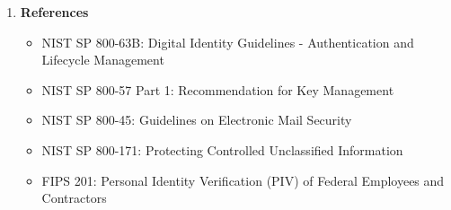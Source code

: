 \documentclass[11pt,letterpaper]{article}
\newcommand{\dmsection}[1]{\item \textbf{#1}\par}
\begin{document}
\begin{enumerate}
\begin{enumerate}
    \item \textbf{Certificate-based encryption} (S/MIME with PIV/CAC) is the preferred method when feasible
    \item When using password-based encryption, passwords \textbf{SHALL} be transmitted via out-of-band channel (phone, SMS, in-person)
    \item The password email feature is retained for operational flexibility but includes prominent warnings about NIST non-compliance
    \item Documentation clearly states these requirements
\end{enumerate}

\dmsection{References}

\begin{itemize}
    \item NIST SP 800-63B: Digital Identity Guidelines - Authentication and Lifecycle Management
    \item NIST SP 800-57 Part 1: Recommendation for Key Management
    \item NIST SP 800-45: Guidelines on Electronic Mail Security
    \item NIST SP 800-171: Protecting Controlled Unclassified Information
    \item FIPS 201: Personal Identity Verification (PIV) of Federal Employees and Contractors
\end{itemize}

\end{enumerate}
\end{document}
